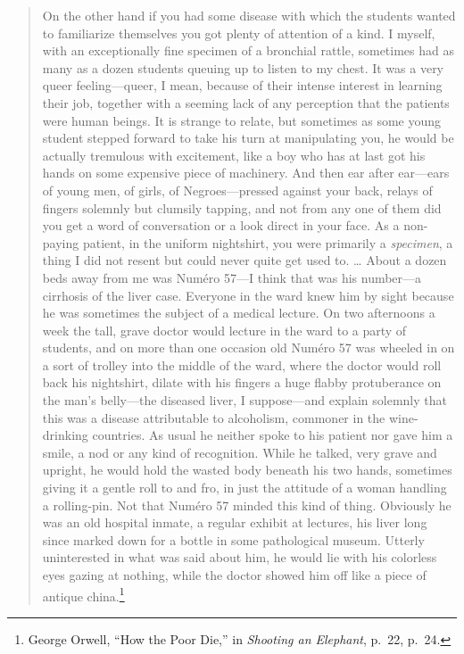 \documentclass[twoside,symmetric,nobib,justified]{tufte-book}
\begin{document}
\begin{quote}
On the other hand if you had some disease with which the students wanted
to familiarize themselves you got plenty of attention of a kind. I
myself, with an exceptionally fine specimen of a bronchial rattle,
sometimes had as many as a dozen students queuing up to listen to my
chest. It was a very queer feeling---queer, I mean, because of their
intense interest in learning their job, together with a seeming lack of
any perception that the patients were human beings. It is strange to
relate, but sometimes as some young student stepped forward to take his
turn at manipulating you, he would be actually tremulous with
excitement, like a boy who has at last got his hands on some expensive
piece of machinery. And then ear after ear---ears of young men, of
girls, of Negroes---pressed against your back, relays of fingers
solemnly but clumsily tapping, and not from any one of them did you get
a word of conversation or a look direct in your face. As a non-paying
patient, in the uniform nightshirt, you were primarily a
\emph{specimen}, a thing I did not resent but could never quite get used
to. \ldots{} About a dozen beds away from me was Numéro 57---I think
that was his number---a cirrhosis of the liver case. Everyone in the
ward knew him by sight because he was sometimes the subject of a medical
lecture. On two afternoons a week the tall, grave doctor would lecture
in the ward to a party of students, and on more than one occasion old
Numéro 57 was wheeled in on a sort of trolley into the middle of the
ward, where the doctor would roll back his nightshirt, dilate with his
fingers a huge flabby protuberance on the man's belly---the diseased
liver, I suppose---and explain solemnly that this was a disease
attributable to alcoholism, commoner in the wine-drinking countries. As
usual he neither spoke to his patient nor gave him a smile, a nod or any
kind of recognition. While he talked, very grave and upright, he would
hold the wasted body beneath his two hands, sometimes giving it a gentle
roll to and fro, in just the attitude of a woman handling a rolling-pin.
Not that Numéro 57 minded this kind of thing. Obviously he was an old
hospital inmate, a regular exhibit at lectures, his liver long since
marked down for a bottle in some pathological museum. Utterly
uninterested in what was said about him, he would lie with his colorless
eyes gazing at nothing, while the doctor showed him off like a piece of
antique china.\footnote{George Orwell, ``How the Poor Die,'' in
  \emph{Shooting an Elephant}, p.~22, p.~24.}
\end{quote}
\end{document}
